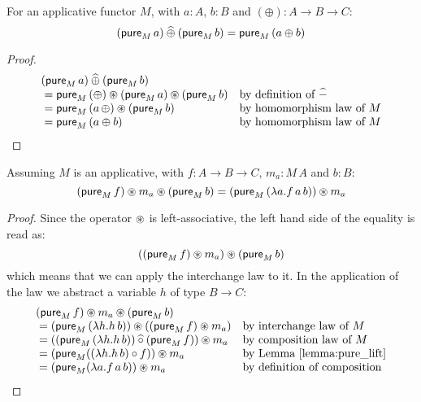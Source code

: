 
\begin{lemma}\label{lemma:pure_lift}
For an applicative functor $M$, with $a:A$, $b:B$ and $(\oplus) : A \rightarrow B \rightarrow C$:
$$
(\mathsf{pure}_M\, a) \mathbin{\widehat{\oplus}} (\mathsf{pure}_M\, b) = \mathsf{pure}_M\, (a \oplus b)
$$
\end{lemma}
\begin{proof}
$$
\begin{array}{ll}
(\mathsf{pure}_M\, a) \mathbin{\widehat{\oplus}} (\mathsf{pure}_M\, b) \\
{}= \mathsf{pure}_M\, (\oplus) \circledast (\mathsf{pure}_M\, a) \circledast (\mathsf{pure}_M\, b)
  & \mbox{by definition of }\mathbin{\widehat{-}}\\
{}= \mathsf{pure}_M\, (a\, \oplus) \circledast (\mathsf{pure}_M\, b)
  & \mbox{by homomorphism law of }M\\
{}= \mathsf{pure}_M\, (a \oplus b)
  & \mbox{by homomorphism law of }M\\
\end{array}
$$
\end{proof}

\begin{lemma}\label{lemma:applicative_flip}
Assuming $M$ is an applicative, with $f : A \rightarrow B \rightarrow C$, $m_a : M\, A$ and $b : B$:
$$
(\mathsf{pure}_M\, f) \circledast m_a \circledast (\mathsf{pure}_M\, b) = (\mathsf{pure}_M\, (\lambda a . f\, a\, b)) \circledast m_a
$$
\end{lemma}
\begin{proof}
Since the operator $\circledast$ is left-associative, the left hand side of the equality is read as:
$$
((\mathsf{pure}_M\, f) \circledast m_a) \circledast (\mathsf{pure}_M\, b)
$$
which means that we can apply the interchange law to it.
In the application of the law we abstract a variable $h$ of type $B\rightarrow C$:
$$
\begin{array}{ll}
(\mathsf{pure}_M\, f) \circledast m_a \circledast (\mathsf{pure}_M\, b) \\
{} =  (\mathsf{pure}_M\, (\lambda h. h\, b)) \circledast ((\mathsf{pure}_M\, f) \circledast m_a)
 & \mbox{by interchange law of }M\\
{} =  ((\mathsf{pure}_M\, (\lambda h. h\, b)) \mathbin{\widehat{\circ}} (\mathsf{pure}_M\, f)) \circledast m_a
 & \mbox{by composition law of }M\\
{} =  (\mathsf{pure}_M ( (\lambda h. h\, b) \circ f ) ) \circledast m_a
 & \mbox{by Lemma \ref{lemma:pure_lift}}\\
{} =  (\mathsf{pure}_M (\lambda a. f\, a\, b )) \circledast m_a
 & \mbox{by definition of composition}\\
\end{array}
$$
\end{proof}

